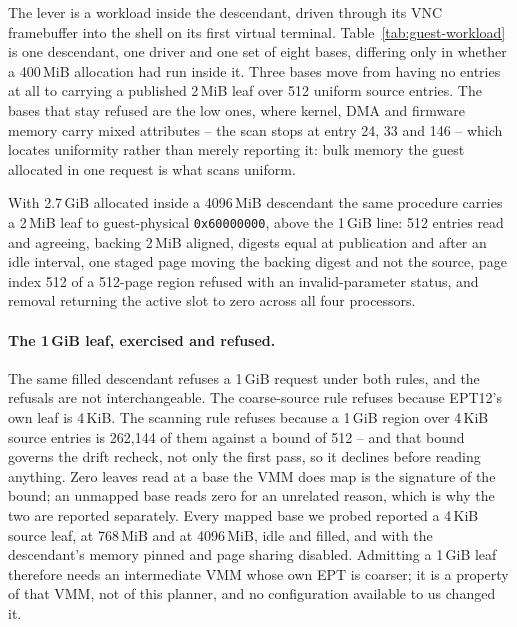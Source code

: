 The lever is a workload inside the descendant, driven through its VNC
framebuffer into the shell on its first virtual terminal. Table~\ref{tab:guest-workload}
is one descendant, one driver and one set of eight bases, differing only in
whether a 400\,MiB allocation had run inside it. Three bases move from having no
entries at all to carrying a published 2\,MiB leaf over 512 uniform source
entries. The bases that stay refused are the low ones, where kernel, DMA and
firmware memory carry mixed attributes -- the scan stops at entry 24, 33 and 146
-- which locates uniformity rather than merely reporting it: bulk memory the
guest allocated in one request is what scans uniform.

\begin{table}[tbp]
\centering\small
\caption{The same eight guest-physical bases before and after a workload ran
inside the descendant. ``Leaves read'' is how many source entries the scanning
rule examined before admitting or refusing; an unmapped base reads none.}
\label{tab:guest-workload}

\end{table}

With 2.7\,GiB allocated inside a 4096\,MiB descendant the same procedure carries
a 2\,MiB leaf to guest-physical \texttt{0x60000000}, above the 1\,GiB line: 512
entries read and agreeing, backing 2\,MiB aligned, digests equal at publication
and after an idle interval, one staged page moving the backing digest and not
the source, page index 512 of a 512-page region refused with an
invalid-parameter status, and removal returning the active slot to zero across
all four processors.

\paragraph{The 1\,GiB leaf, exercised and refused.}
The same filled descendant refuses a 1\,GiB request under both rules, and the
refusals are not interchangeable. The coarse-source rule refuses because EPT12's
own leaf is 4\,KiB. The scanning rule refuses because a 1\,GiB region over
4\,KiB source entries is 262,144 of them against a bound of 512 -- and that
bound governs the drift recheck, not only the first pass, so it declines before
reading anything. Zero leaves read at a base the VMM does map is the signature
of the bound; an unmapped base reads zero for an unrelated reason, which is why
the two are reported separately. Every mapped base we probed reported a 4\,KiB
source leaf, at 768\,MiB and at 4096\,MiB, idle and filled, and with the
descendant's memory pinned and page sharing disabled. Admitting a 1\,GiB leaf
therefore needs an intermediate VMM whose own EPT is coarser; it is a property
of that VMM, not of this planner, and no configuration available to us changed
it.

